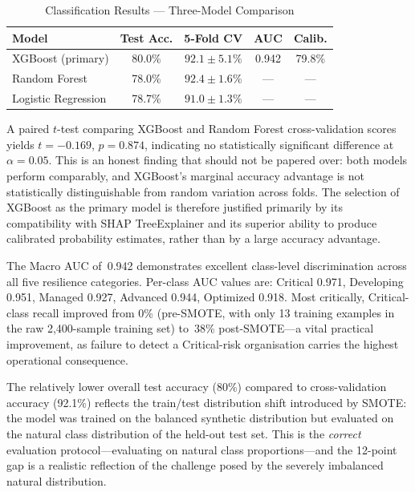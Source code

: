 \documentclass[journal]{IEEEtran}
\begin{document}
\begin{table}[!t]
\renewcommand{\arraystretch}{1.3}
\caption{Classification Results --- Three-Model Comparison}
\label{tab:classif}
\centering
\begin{tabular}{lcccc}
\toprule
\textbf{Model} & \textbf{Test Acc.} & \textbf{5-Fold CV} & \textbf{AUC} & \textbf{Calib.} \\
\midrule
XGBoost (primary)      & 80.0\% & $92.1\pm5.1$\% & 0.942 & 79.8\% \\
Random Forest          & 78.0\% & $92.4\pm1.6$\% & ---   & ---    \\
Logistic Regression    & 78.7\% & $91.0\pm1.3$\% & ---   & ---    \\
\bottomrule
\end{tabular}
\end{table}

A paired $t$-test comparing XGBoost and Random Forest cross-validation scores
yields $t = -0.169$, $p = 0.874$, indicating no statistically significant
difference at $\alpha = 0.05$. This is an honest finding that should not
be papered over: both models perform comparably, and XGBoost's marginal
accuracy advantage is not statistically distinguishable from random variation
across folds. The selection of XGBoost as the primary model is therefore
justified primarily by its compatibility with SHAP TreeExplainer and its
superior ability to produce calibrated probability estimates, rather than
by a large accuracy advantage.

The Macro AUC of~0.942 demonstrates excellent class-level discrimination
across all five resilience categories. Per-class AUC values are: Critical
0.971, Developing 0.951, Managed 0.927, Advanced 0.944, Optimized 0.918.
Most critically, Critical-class recall improved from 0\% (pre-SMOTE, with
only 13 training examples in the raw 2,400-sample training set) to~38\%
post-SMOTE---a vital practical improvement, as failure to detect a
Critical-risk organisation carries the highest operational consequence.

The relatively lower overall test accuracy (80\%) compared to cross-validation
accuracy (92.1\%) reflects the train/test distribution shift introduced by
SMOTE: the model was trained on the balanced synthetic distribution but
evaluated on the natural class distribution of the held-out test set. This
is the \emph{correct} evaluation protocol---evaluating on natural class
proportions---and the 12-point gap is a realistic reflection of the
challenge posed by the severely imbalanced natural distribution.
\end{document}
